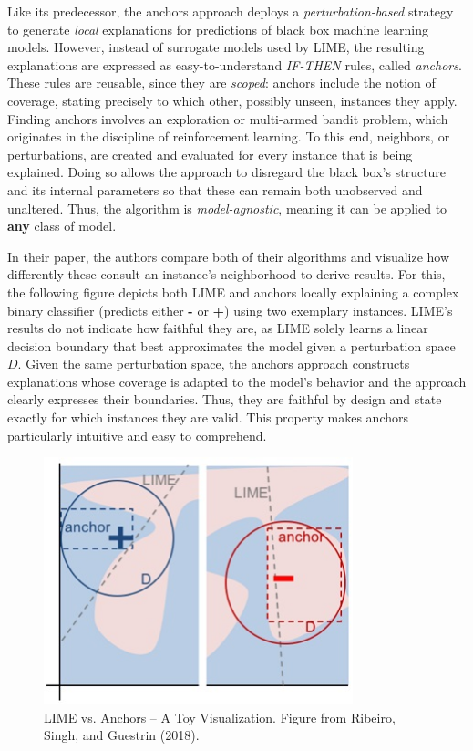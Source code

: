 \documentclass[
  10pt,
]{scrbook}
\begin{document}
Like its predecessor, the anchors approach deploys a \emph{perturbation-based} strategy to generate \emph{local} explanations for predictions of black box machine learning models.
However, instead of surrogate models used by LIME, the resulting explanations are expressed as easy-to-understand \emph{IF-THEN} rules, called \emph{anchors}.
These rules are reusable, since they are \emph{scoped}:
anchors include the notion of coverage, stating precisely to which other, possibly unseen, instances they apply.
Finding anchors involves an exploration or multi-armed bandit problem, which originates in the discipline of reinforcement learning.
To this end, neighbors, or perturbations, are created and evaluated for every instance that is being explained.
Doing so allows the approach to disregard the black box's structure and its internal parameters so that these can remain both unobserved and unaltered.
Thus, the algorithm is \emph{model-agnostic}, meaning it can be applied to \textbf{any} class of model.

In their paper, the authors compare both of their algorithms and visualize how differently these consult an instance's neighborhood to derive results.
For this, the following figure depicts both LIME and anchors locally explaining a complex binary classifier (predicts either \textbf{-} or \textbf{+}) using two exemplary instances.
LIME's results do not indicate how faithful they are, as LIME solely learns a linear decision boundary that best approximates the model given a perturbation space \(D\).
Given the same perturbation space, the anchors approach constructs explanations whose coverage is adapted to the model's behavior and the approach clearly expresses their boundaries.
Thus, they are faithful by design and state exactly for which instances they are valid.
This property makes anchors particularly intuitive and easy to comprehend.

\begin{figure}

{\centering \includegraphics[width=0.8\textwidth]{images/anchors-visualization} 

}

\caption{LIME vs. Anchors -- A Toy Visualization. Figure from Ribeiro, Singh, and Guestrin (2018).}\label{fig:unnamed-chunk-29}
\end{figure}
\end{document}
